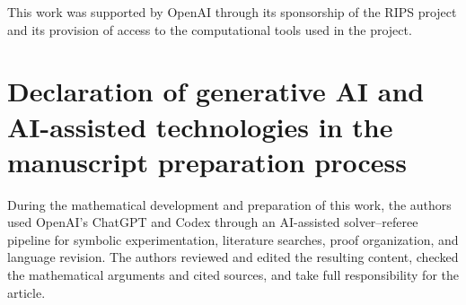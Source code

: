 \documentclass[11pt]{amsart}
\theoremstyle{definition}
\theoremstyle{remark}
\begin{document}
This work was supported by OpenAI through its sponsorship of the RIPS project
and its provision of access to the computational tools used in the project.

\section*{Declaration of generative AI and AI-assisted technologies in the
manuscript preparation process}

During the mathematical development and preparation of this work, the authors
used OpenAI's ChatGPT and Codex through an AI-assisted solver--referee pipeline
for symbolic experimentation, literature searches, proof organization, and
language revision.  The authors reviewed and edited the resulting content,
checked the mathematical arguments and cited sources, and take full
responsibility for the article.



\end{document}
